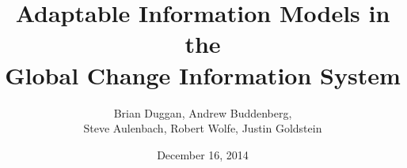 \documentclass{beamer}
\begin{document}
\title[Global Change Information System]{Adaptable Information Models in the\\
Global Change Information System}
\author[Duggan et al]{
    Brian Duggan,
    Andrew Buddenberg, \\
    Steve Aulenbach,
    Robert Wolfe,
    Justin Goldstein
}
\date{December 16, 2014} 


\end{document}
